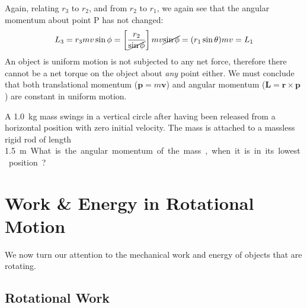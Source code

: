 Again, relating $r_3$ to $r_2$, and from $r_2$ to $r_1$, we again see that the
angular momentum about point P has not changed:
\begin{equation*}
  L_3=r_3mv\sin\phi
  =\left[\frac{r_2}{\cancel{\sin\phi}}\right]mv\cancel{\sin\phi}
  =(r_1\sin\theta)mv=L_1
\end{equation*}
An object is uniform motion is not subjected to any net force, therefore there
cannot be a net torque on the object about \emph{any} point either. We must
conclude that both translational momentum ($\bm p=m\bm v$) and angular momentum
($\bm L=\bm r\times\bm p$) are constant in uniform motion.


\begin{example}
  A \SI{1.0}{\kilo\gram} mass swings in a vertical circle
  after having been released from a horizontal position with zero initial
  velocity. The mass is attached to a massless rigid rod of length
  \SI{1.5}\metre. What is the angular momentum of the mass, when it is in its
  lowest position?
\end{example}


%


\section{Work \& Energy in Rotational Motion}
We now turn our attention to the mechanical work and energy of objects that are
rotating.



\subsection{Rotational Work}

